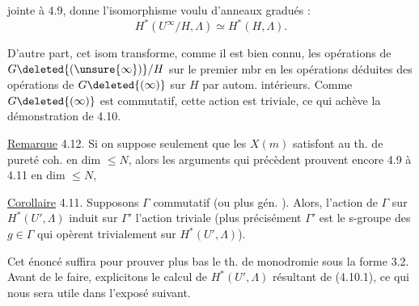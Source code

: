 
jointe à 4.9,  donne l'isomorphisme voulu d'anneaux gradués :
\[
H^*(U^\infty/H,\Lambda)\simeq H^*(H,\Lambda).
\]

D'autre part, cet isom transforme, comme il est bien connu, les opérations de $G\deleted{(\unsure{\infty})}/H$ sur le premier mbr en les opérations déduites des opérations de $G\deleted{(\infty)}$ sur $H$ par autom. intérieurs. Comme $G\deleted{(\infty)}$ est commutatif, cette action est triviale, ce qui achève la démonstration de 4.10.

\uline{Remarque} 4.12. Si on suppose seulement que les $X(m)$ satisfont au th. de pureté coh. en dim $\leq N$, alors les arguments qui précèdent prouvent encore 4.9 à 4.11 en dim $\leq N$, 

\uline{Corollaire} 4.11.   Supposons $\Gamma$ commutatif (ou plus gén. ). Alors, l'action de $\Gamma$ sur $H^*(U',\Lambda)$ induit sur $\Gamma'$ l'action triviale (plus précisément $\Gamma'$ est le s-groupe des $g\in\Gamma$ qui opèrent trivialement sur $H^*(U',\Lambda)$).

Cet énoncé suffira  pour prouver   plus bas le th. de monodromie sous la forme 3.2. Avant de le faire, explicitons le calcul de $H^*(U',\Lambda)$ résultant de (4.10.1), ce qui nous sera utile dans l'exposé suivant.
